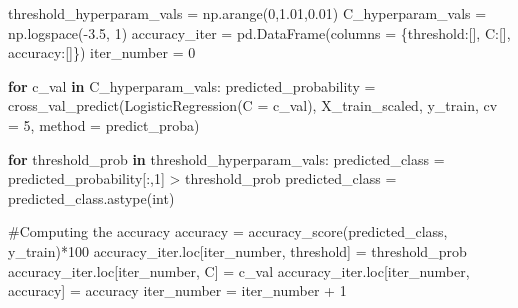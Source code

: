 \documentclass[
  letterpaper,
  DIV=11,
  numbers=noendperiod]{scrreprt}
\newenvironment{Shaded}{\begin{snugshade}}{\end{snugshade}}
\newcommand{\BuiltInTok}[1]{\textcolor[rgb]{0.00,0.23,0.31}{#1}}
\newcommand{\CommentTok}[1]{\textcolor[rgb]{0.37,0.37,0.37}{#1}}
\newcommand{\ControlFlowTok}[1]{\textcolor[rgb]{0.00,0.23,0.31}{\textbf{#1}}}
\newcommand{\DecValTok}[1]{\textcolor[rgb]{0.68,0.00,0.00}{#1}}
\newcommand{\FloatTok}[1]{\textcolor[rgb]{0.68,0.00,0.00}{#1}}
\newcommand{\KeywordTok}[1]{\textcolor[rgb]{0.00,0.23,0.31}{\textbf{#1}}}
\newcommand{\NormalTok}[1]{\textcolor[rgb]{0.00,0.23,0.31}{#1}}
\newcommand{\OperatorTok}[1]{\textcolor[rgb]{0.37,0.37,0.37}{#1}}
\newcommand{\StringTok}[1]{\textcolor[rgb]{0.13,0.47,0.30}{#1}}
\begin{document}
\begin{Shaded}
\begin{Highlighting}[]
\NormalTok{threshold\_hyperparam\_vals }\OperatorTok{=}\NormalTok{ np.arange(}\DecValTok{0}\NormalTok{,}\FloatTok{1.01}\NormalTok{,}\FloatTok{0.01}\NormalTok{)}
\NormalTok{C\_hyperparam\_vals }\OperatorTok{=}\NormalTok{ np.logspace(}\OperatorTok{{-}}\FloatTok{3.5}\NormalTok{, }\DecValTok{1}\NormalTok{)}
\NormalTok{accuracy\_iter }\OperatorTok{=}\NormalTok{ pd.DataFrame(columns }\OperatorTok{=}\NormalTok{ \{}\StringTok{\textquotesingle{}threshold\textquotesingle{}}\NormalTok{:[], }\StringTok{\textquotesingle{}C\textquotesingle{}}\NormalTok{:[], }\StringTok{\textquotesingle{}accuracy\textquotesingle{}}\NormalTok{:[]\})}
\NormalTok{iter\_number }\OperatorTok{=} \DecValTok{0}

\ControlFlowTok{for}\NormalTok{ c\_val }\KeywordTok{in}\NormalTok{ C\_hyperparam\_vals:}
\NormalTok{    predicted\_probability }\OperatorTok{=}\NormalTok{ cross\_val\_predict(LogisticRegression(C }\OperatorTok{=}\NormalTok{ c\_val), X\_train\_scaled, }
\NormalTok{                                                  y\_train, cv }\OperatorTok{=} \DecValTok{5}\NormalTok{, method }\OperatorTok{=} \StringTok{\textquotesingle{}predict\_proba\textquotesingle{}}\NormalTok{)}

    \ControlFlowTok{for}\NormalTok{ threshold\_prob }\KeywordTok{in}\NormalTok{ threshold\_hyperparam\_vals:}
\NormalTok{        predicted\_class }\OperatorTok{=}\NormalTok{ predicted\_probability[:,}\DecValTok{1}\NormalTok{] }\OperatorTok{\textgreater{}}\NormalTok{ threshold\_prob}
\NormalTok{        predicted\_class }\OperatorTok{=}\NormalTok{ predicted\_class.astype(}\BuiltInTok{int}\NormalTok{)}

        \CommentTok{\#Computing the accuracy}
\NormalTok{        accuracy }\OperatorTok{=}\NormalTok{ accuracy\_score(predicted\_class, y\_train)}\OperatorTok{*}\DecValTok{100}
\NormalTok{        accuracy\_iter.loc[iter\_number, }\StringTok{\textquotesingle{}threshold\textquotesingle{}}\NormalTok{] }\OperatorTok{=}\NormalTok{ threshold\_prob}
\NormalTok{        accuracy\_iter.loc[iter\_number, }\StringTok{\textquotesingle{}C\textquotesingle{}}\NormalTok{] }\OperatorTok{=}\NormalTok{ c\_val}
\NormalTok{        accuracy\_iter.loc[iter\_number, }\StringTok{\textquotesingle{}accuracy\textquotesingle{}}\NormalTok{] }\OperatorTok{=}\NormalTok{ accuracy}
\NormalTok{        iter\_number }\OperatorTok{=}\NormalTok{ iter\_number }\OperatorTok{+} \DecValTok{1}
\end{Highlighting}
\end{Shaded}
\end{document}
